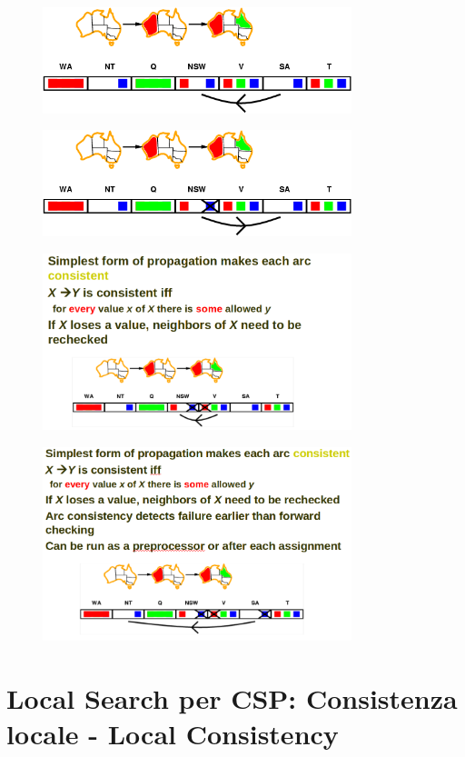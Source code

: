 \begin{figure}[H]
    \centering
    \includegraphics[width=9cm, keepaspectratio]{img/Cap3/prova4.png}
\end{figure}
\begin{figure}[H]
    \centering
    \includegraphics[width=9cm, keepaspectratio]{img/Cap3/prova5.png}
\end{figure}
\begin{figure}[H]
    \centering
    \includegraphics[width=9cm, keepaspectratio]{img/Cap3/prova6.png}
\end{figure}
\begin{figure}[H]
    \centering
    \includegraphics[width=9cm, keepaspectratio]{img/Cap3/prova7.png}
\end{figure}

\chapter{Local Search per CSP: Consistenza locale - Local Consistency}
\label{ch:Local Search per Crisp CSP: Consistenza locale}
